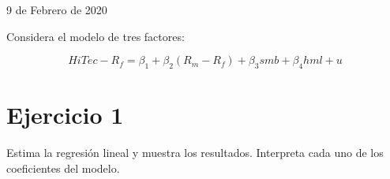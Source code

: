 \documentclass[12pt]{article}
\numberwithin{equation}{section} %
\begin{document}
\begin{titlepage}
	
	\vfill\vfill\vfill %
	
	{\large 9 de Febrero de 2020} %
	
	
	 
	
	\vfill %
	
\end{titlepage}


\clearpage
\tableofcontents
\clearpage


\setcounter{footnote}{0} %
\renewcommand*{\thefootnote}{\arabic{footnote}} %

Considera el modelo de tres factores:

\begin{equation}\label{maineq}
    HiTec − R_f = \beta_1 + \beta_2(R_m-R_f) + \beta_3smb + \beta_4hml + u
\end{equation}


\section{Ejercicio 1} Estima la regresión lineal y muestra los resultados. Interpreta cada uno de los coeficientes del modelo.
\end{document}
